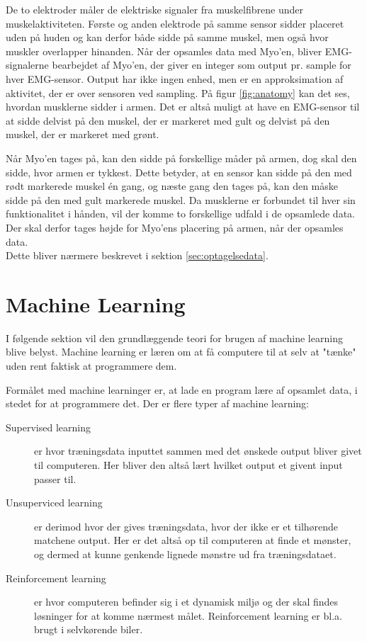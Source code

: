 De to elektroder måler de elektriske signaler fra muskelfibrene under muskelaktiviteten\citep{RefWorks:13}. Første og anden elektrode på samme sensor sidder placeret uden på huden og kan derfor både sidde på samme muskel, men også hvor muskler overlapper hinanden. Når der opsamles data med Myo'en, bliver EMG-signalerne bearbejdet af Myo'en, der giver en integer som output pr. sample for hver EMG-sensor. Output har ikke ingen enhed, men er en approksimation af aktivitet, der er over sensoren ved sampling. På figur \ref{fig:anatomy} kan det ses, hvordan musklerne sidder i armen. Det er altså muligt at have en EMG-sensor til at sidde delvist på den muskel, der er markeret med gult og delvist på den muskel, der er markeret med grønt.


Når Myo'en tages på, kan den sidde på forskellige måder på armen, dog skal den sidde, hvor armen er tykkest. Dette betyder, at en sensor kan sidde på den med rødt markerede muskel én gang, og næste gang den tages på, kan den måske sidde på den med gult markerede muskel. Da musklerne er forbundet til hver sin funktionalitet i hånden, vil der komme to forskellige udfald i de opsamlede data. Der skal derfor tages højde for Myo'ens placering på armen, når der opsamles data.\\
Dette bliver nærmere beskrevet i sektion \ref{sec:optagelsedata}.

\section{Machine Learning}
\label{sec:machineLearning}
I følgende sektion vil den grundlæggende teori for brugen af machine learning blive belyst. Machine learning er læren om at få computere til at selv at "tænke" uden rent faktisk at programmere dem.

Formålet med machine learninger er, at lade en program lære af opsamlet data, i stedet for at programmere det. Der er flere typer af machine learning\citep{PatternBishop}:
\begin{description}
	\item[Supervised learning] er hvor træningsdata inputtet sammen med det ønskede output bliver givet til computeren. Her bliver den altså lært hvilket output et givent input passer til.
	\item[Unsuperviced learning] er derimod hvor der gives træningsdata, hvor der ikke er et tilhørende matchene output. Her er det altså op til computeren at finde et mønster, og dermed at kunne genkende lignede mønstre ud fra træningsdataet.
	\item[Reinforcement learning] er hvor computeren befinder sig i et dynamisk miljø og der skal findes løsninger for at komme nærmest målet. Reinforcement learning er bl.a. brugt i selvkørende biler.
\end{description}


